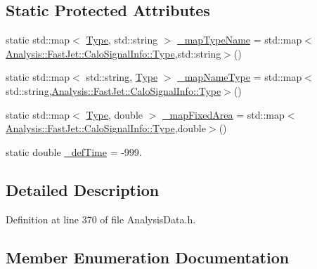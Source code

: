 \subsection*{Static Protected Attributes}
\begin{DoxyCompactItemize}
\item 
static std\+::map$<$ \hyperlink{classAnalysis_1_1FastJet_1_1CaloSignalInfo_ac03e8f6d7fb631eab49a9ab02cda7675}{Type}, std\+::string $>$ \hyperlink{classAnalysis_1_1FastJet_1_1CaloSignalInfo_a02077135796cf03c3d55144e7201c2db}{\+\_\+map\+Type\+Name} = std\+::map$<$\hyperlink{classAnalysis_1_1FastJet_1_1CaloSignalInfo_ac03e8f6d7fb631eab49a9ab02cda7675}{Analysis\+::\+Fast\+Jet\+::\+Calo\+Signal\+Info\+::\+Type},std\+::string$>$()
\item 
static std\+::map$<$ std\+::string, \hyperlink{classAnalysis_1_1FastJet_1_1CaloSignalInfo_ac03e8f6d7fb631eab49a9ab02cda7675}{Type} $>$ \hyperlink{classAnalysis_1_1FastJet_1_1CaloSignalInfo_abf6ff7b4cc2f83468d4c8e4ce19e9845}{\+\_\+map\+Name\+Type} = std\+::map$<$std\+::string,\hyperlink{classAnalysis_1_1FastJet_1_1CaloSignalInfo_ac03e8f6d7fb631eab49a9ab02cda7675}{Analysis\+::\+Fast\+Jet\+::\+Calo\+Signal\+Info\+::\+Type}$>$()
\item 
static std\+::map$<$ \hyperlink{classAnalysis_1_1FastJet_1_1CaloSignalInfo_ac03e8f6d7fb631eab49a9ab02cda7675}{Type}, double $>$ \hyperlink{classAnalysis_1_1FastJet_1_1CaloSignalInfo_a239a18104bf9715d803b912b668fce21}{\+\_\+map\+Fixed\+Area} = std\+::map$<$\hyperlink{classAnalysis_1_1FastJet_1_1CaloSignalInfo_ac03e8f6d7fb631eab49a9ab02cda7675}{Analysis\+::\+Fast\+Jet\+::\+Calo\+Signal\+Info\+::\+Type},double$>$()
\item 
static double \hyperlink{classAnalysis_1_1FastJet_1_1CaloSignalInfo_acd4a5a250d92298dd91d4081be322f72}{\+\_\+def\+Time} = -\/999.
\end{DoxyCompactItemize}


\subsection{Detailed Description}


Definition at line 370 of file Analysis\+Data.\+h.



\subsection{Member Enumeration Documentation}
